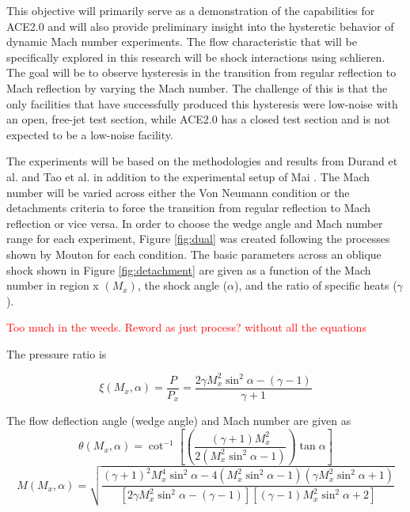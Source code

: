 This objective will primarily serve as a demonstration of the capabilities for ACE2.0 and will also provide preliminary insight into the hysteretic behavior of dynamic Mach number experiments. The flow characteristic that will be specifically explored in this research will be shock interactions using schlieren. The goal will be to observe hysteresis in the transition from regular reflection to Mach reflection by varying the Mach number. The challenge of this is that the only facilities that have successfully produced this hysteresis were low-noise with an open, free-jet test section, while ACE2.0 has a closed test section and is not expected to be a low-noise facility.

The experiments will be based on the methodologies and results from Durand et al. \cite{durand} and Tao et al. \cite{tao} in addition to the experimental setup of Mai \cite{mai-dis}. The Mach number will be varied across either the Von Neumann condition or the detachments criteria to force the transition from regular reflection to Mach reflection or vice versa. In order to choose the wedge angle and Mach number range for each experiment, Figure \ref{fig:dual} was created following the processes shown by Mouton \cite{mouton} for each condition. The basic parameters across an oblique shock shown in Figure \ref{fig:detachment} are given as a function of the Mach number in region x $\left(M_x\right)$, the shock angle ($\alpha$), and the ratio of specific heats ($\gamma$). 

\textcolor{red}{Too much in the weeds. Reword as just process? without all the equations}

The pressure ratio is 

\begin{equation}
    \xi \left(M_x,\alpha\right) = \frac{P}{P_x} = \frac{2 \gamma M_x^2 \sin^2{\alpha} - (\gamma-1)}{\gamma+1}
\end{equation}

\noindent The flow deflection angle (wedge angle) and Mach number are given as
\begin{equation}
    \theta \left(M_x,\alpha\right) = \cot^{-1}{\left[ \left(\frac{(\gamma+1) M_x^2}{2\left(M_x^2 \sin^2{\alpha} - 1\right)}\right) \tan{\alpha} \right]}
\end{equation}
\begin{equation}
    M \left(M_x,\alpha\right) = \sqrt{\frac{(\gamma+1)^2 M_x^4 \sin^2{\alpha} - 4\left(M_x^2 \sin^2{\alpha} - 1\right)\left(\gamma M_x^2 \sin^2{\alpha} + 1\right)}{\left[2 \gamma M_x^2 \sin^2{\alpha} - (\gamma-1)\right]\left[(\gamma-1) M_x^2 \sin^2{\alpha} + 2\right]}}
\end{equation}

